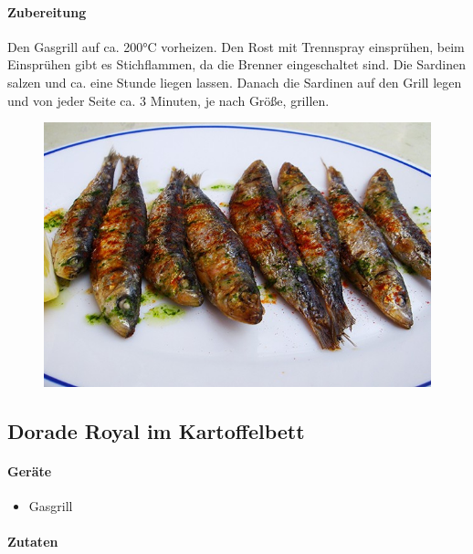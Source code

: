 \paragraph{Zubereitung}

Den Gasgrill auf ca. 200°C vorheizen. Den Rost mit Trennspray einsprühen,  beim Einsprühen gibt es Stichflammen, da die Brenner 
eingeschaltet sind. Die Sardinen salzen und ca. eine Stunde liegen lassen. Danach die Sardinen auf den Grill legen und von jeder Seite ca. 3 
Minuten, je nach Größe,  grillen. 

\begin{figure}[htbp]
	\centering
	\begin{minipage}{1\textwidth}
		\centering
		\includegraphics[width=.9\linewidth]{pics/Gegrillte_Sardinen}
		\label{fig:Gegrillte_Sardinen}
	\end{minipage}
\end{figure}
\newpage

\subsection{Dorade Royal im Kartoffelbett}

\paragraph{Geräte}

\begin{itemize}[noitemsep]
	\item Gasgrill
\end{itemize}

\paragraph{Zutaten}

